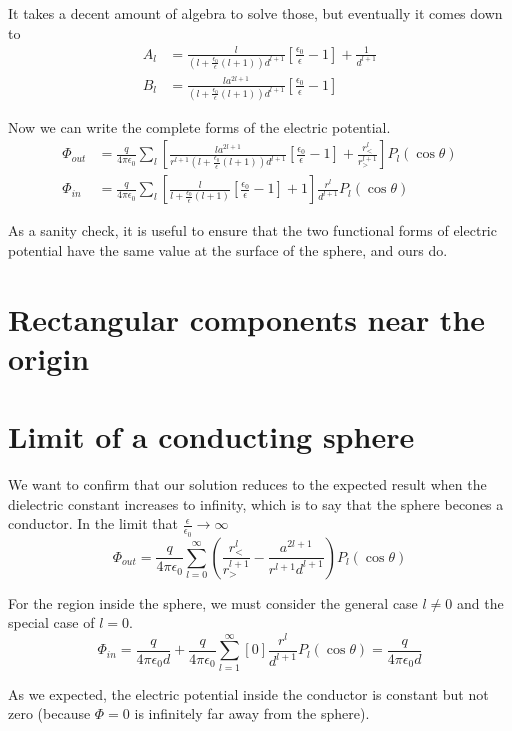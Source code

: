 \documentclass[10pt,a4paper]{article}
\begin{document}
It takes a decent amount of algebra to solve those, but eventually it comes down to
\begin{align}
A_l&=\frac{l}{(l+\frac{\epsilon_0}{\epsilon}(l+1))d^{l+1}}\left[\frac{\epsilon_0}{\epsilon}-1\right]+\frac{1}{d^{l+1}} \\
B_l&=\frac{la^{2l+1}}{(l+\frac{\epsilon_0}{\epsilon}(l+1))d^{l+1}}\left[\frac{\epsilon_0}{\epsilon}-1\right]
\end{align}

Now we can write the complete forms of the electric potential.
\begin{align}
\Phi_{out}&=\frac{q}{4\pi\epsilon_0}\sum_l\left[\frac{la^{2l+1}}{r^{l+1}(l+\frac{\epsilon_0}{\epsilon}(l+1))d^{l+1}}\left[\frac{\epsilon_0}{\epsilon}-1\right]+\frac{r_<^l}{r_>^{l+1}}\right]P_l(\cos\theta) \\
\Phi_{in} &=\frac{q}{4\pi\epsilon_0}\sum_l\left[\frac{l}{l+\frac{\epsilon_0}{\epsilon}(l+1)}\left[\frac{\epsilon_0}{\epsilon}-1\right]+1\right]\frac{r^l}{d^{l+1}}P_l(\cos\theta)
\end{align}

As a sanity check, it is useful to ensure that the two functional forms of electric potential have the same value at the surface of the sphere, and ours do.

\section{Rectangular components near the origin}

\section{Limit of a conducting sphere}
We want to confirm that our solution reduces to the expected result when the dielectric constant increases to infinity, which is to say that the sphere becones a conductor.  In the limit that $\frac{\epsilon}{\epsilon_0}\rightarrow\infty$
\begin{equation}
\Phi_{out}=\frac{q}{4\pi\epsilon_0}\sum_{l=0}^\infty\left(\frac{r_<^l}{r_>^{l+1}}-\frac{a^{2l+1}}{r^{l+1}d^{l+1}}\right)P_l(\cos\theta)
\end{equation}

For the region inside the sphere, we must consider the general case $l\neq0$ and the special case of $l=0$.
\begin{equation}
\Phi_{in}=\frac{q}{4\pi\epsilon_0d}+\frac{q}{4\pi\epsilon_0}\sum_{l=1}^\infty[0]\frac{r^l}{d^{l+1}}P_l(\cos\theta)=\frac{q}{4\pi\epsilon_0d}
\end{equation}

As we expected, the electric potential inside the conductor is constant but not zero (because $\Phi=0$ is infinitely far away from the sphere).
\end{document}
